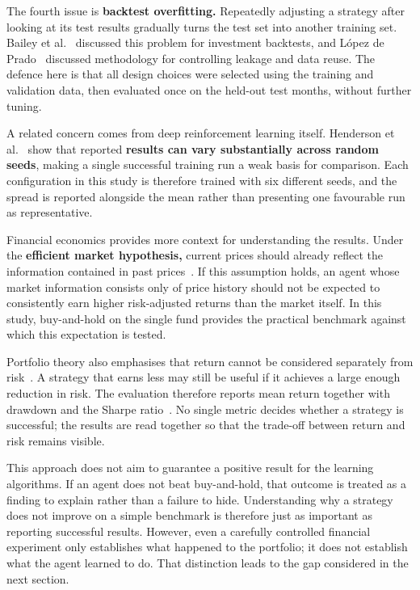 The fourth issue is \textbf{backtest overfitting.} Repeatedly adjusting
a strategy after looking at its test results gradually turns the test
set into another training set. Bailey et al.~\cite{bailey2014} discussed this
problem for investment backtests, and López de Prado~\cite{lopezdeprado2018} discussed
methodology for controlling leakage and data reuse. The defence here is
that all design choices were selected using the training and validation
data, then evaluated once on the held-out test months, without further tuning.

A related concern comes from deep reinforcement learning itself.
Henderson et al.~\cite{henderson2018} show that reported \textbf{results can vary
substantially across random seeds}, making a single successful training
run a weak basis for comparison. Each configuration in this study is
therefore trained with six different seeds, and the spread is reported
alongside the mean rather than presenting one favourable run as
representative.

Financial economics provides more context for understanding the results.
Under the \textbf{efficient market hypothesis,} current prices should
already reflect the information contained in past prices~\cite{fama1970}. If
this assumption holds, an agent whose market information consists only
of price history should not be expected to consistently earn higher
risk-adjusted returns than the market itself. In this study,
buy-and-hold on the single fund provides the practical benchmark against
which this expectation is tested.

Portfolio theory also emphasises that return cannot be considered
separately from risk~\cite{markowitz1952}. A strategy that earns less may still be
useful if it achieves a large enough reduction in risk. The evaluation
therefore reports mean return together with drawdown and the Sharpe
ratio~\cite{sharpe1994}. No single metric decides whether a strategy is
successful; the results are read together so that the trade-off between
return and risk remains visible.

This approach does not aim to guarantee a positive result for the
learning algorithms. If an agent does not beat buy-and-hold, that
outcome is treated as a finding to explain rather than a failure to
hide. Understanding why a strategy does not improve on a simple
benchmark is therefore just as important as reporting successful
results. However, even a carefully controlled financial experiment only
establishes what happened to the portfolio; it does not establish what
the agent learned to do. That distinction leads to the gap considered in
the next section.


